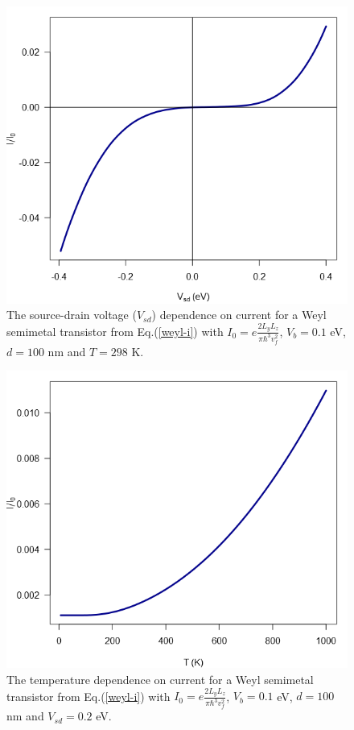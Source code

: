 \documentclass[prb,twocolumn,aps,superscriptaddress,showpacs,floatfix]{revtex4}
\begin{document}
\begin{figure}
	\centerline{\includegraphics[scale=0.4]{barrier-ivsd}}
	\caption{The source-drain voltage ($V_{sd}$) dependence on current for a Weyl semimetal transistor from Eq.(\ref{weyl-i}) with $I_{0}=e\frac{2L_{y}L_{z}}{\pi\hbar^{3}v_{f}^{2}}$, $V_{b}=0.1$ eV, $d=100$ nm and $T=298$ K.}
	\label{barrier-isd}
\end{figure}


\begin{figure}
	\centerline{\includegraphics[scale=0.4]{barrier-it}}
	\caption{The temperature dependence on current for a Weyl semimetal transistor from Eq.(\ref{weyl-i}) with $I_{0}=e\frac{2L_{y}L_{z}}{\pi\hbar^{3}v_{f}^{2}}$, $V_{b}=0.1$ eV, $d=100$ nm and $V_{sd}=0.2$ eV.}
	\label{barrier-it}
\end{figure}
\end{document}
